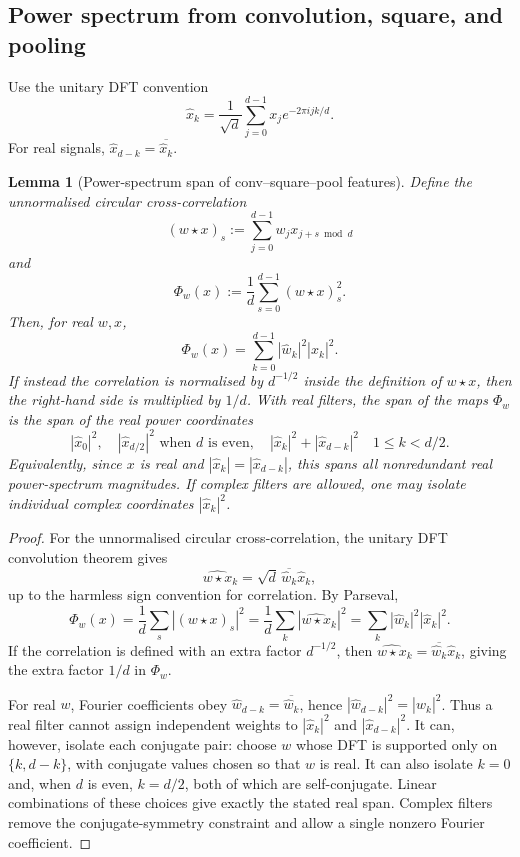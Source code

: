 \documentclass[11pt]{article}
\theoremstyle{plain}
\newtheorem{lemma}{Lemma}
\theoremstyle{definition}
\theoremstyle{remark}
\begin{document}
\subsection{Power spectrum from convolution, square, and pooling}\label{sec:ps}
Use the unitary DFT convention
\[
\hat x_k=\frac1{\sqrt d}\sum_{j=0}^{d-1}x_j e^{-2\pi i jk/d}.
\]
For real signals, $\hat x_{d-k}=\overline{\hat x_k}$.

\begin{lemma}[Power-spectrum span of conv--square--pool features]\label{lem:ps-corrected}
Define the unnormalised circular cross-correlation
\[
(w\star x)_s:=\sum_{j=0}^{d-1}w_jx_{j+s\bmod d}
\]
and
\[
\Phi_w(x):=\frac1d\sum_{s=0}^{d-1}(w\star x)_s^2.
\]
Then, for real $w,x$,
\[
\Phi_w(x)=\sum_{k=0}^{d-1}|\hat w_k|^2|\hat x_k|^2.
\]
If instead the correlation is normalised by $d^{-1/2}$ inside the definition of $w\star x$, then the right-hand side is multiplied by $1/d$.  With real filters, the span of the maps $\Phi_w$ is the span of the real power coordinates
\[
|\hat x_0|^2,
\quad |\hat x_{d/2}|^2\text{ when }d\text{ is even},
\quad |\hat x_k|^2+|\hat x_{d-k}|^2\quad 1\le k<d/2.
\]
Equivalently, since $x$ is real and $|\hat x_k|=|\hat x_{d-k}|$, this spans all nonredundant real power-spectrum magnitudes.  If complex filters are allowed, one may isolate individual complex coordinates $|\hat x_k|^2$.
\end{lemma}

\begin{proof}
For the unnormalised circular cross-correlation, the unitary DFT convolution theorem gives
\[
\widehat{w\star x}_k=\sqrt d\,\overline{\hat w_k}\hat x_k,
\]
up to the harmless sign convention for correlation.  By Parseval,
\[
\Phi_w(x)
=\frac1d\sum_s |(w\star x)_s|^2
=\frac1d\sum_k |\widehat{w\star x}_k|^2
=\sum_k |\hat w_k|^2|\hat x_k|^2.
\]
If the correlation is defined with an extra factor $d^{-1/2}$, then $\widehat{w\star x}_k=\overline{\hat w_k}\hat x_k$, giving the extra factor $1/d$ in $\Phi_w$.

For real $w$, Fourier coefficients obey $\hat w_{d-k}=\overline{\hat w_k}$, hence $|\hat w_{d-k}|^2=|\hat w_k|^2$.  Thus a real filter cannot assign independent weights to $|\hat x_k|^2$ and $|\hat x_{d-k}|^2$.  It can, however, isolate each conjugate pair: choose $w$ whose DFT is supported only on $\{k,d-k\}$, with conjugate values chosen so that $w$ is real.  It can also isolate $k=0$ and, when $d$ is even, $k=d/2$, both of which are self-conjugate.  Linear combinations of these choices give exactly the stated real span.  Complex filters remove the conjugate-symmetry constraint and allow a single nonzero Fourier coefficient.
\end{proof}
\end{document}
